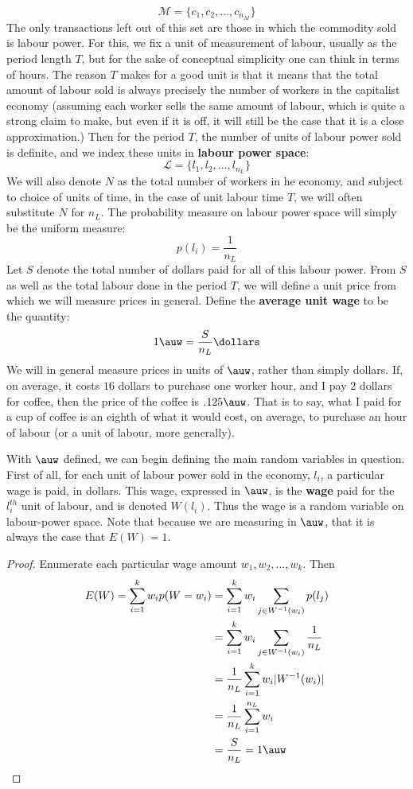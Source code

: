 \[ \mathcal{M} = \{c_1,c_2,...,c_{n_M}\} \]
The only transactions left out of this set are those in which the commodity sold is labour power. For this, we fix a unit of measurement of labour, usually as the period length $T$, but for the sake of conceptual simplicity one can think in terms of hours. The reason $T$ makes for a good unit is that it means that the total amount of labour sold is always precisely the number of workers in the capitalist economy (assuming each worker sells the same amount of labour, which is quite a strong claim to make, but even if it is off, it will still be the case that it is a close approximation.) Then for the period $T$, the number of units of labour power sold is definite, and we index these units in \textbf{labour power space}:
\[ \mathcal{L} = \{l_1,l_2,...,l_{n_L}\} \]
We will also denote $N$ as the total number of workers in he economy, and subject to choice of units of time, in the case of unit labour time $T$, we will often substitute $N$ for $n_L$. The probability measure on labour power space will simply be the uniform measure:
\[ p(l_i) = \frac{1}{n_L} \]
Let $S$ denote the total number of dollars paid for all of this labour power. From $S$ as well as the total labour done in the period $T$, we will define a unit price from which we will measure prices in general. Define the \textbf{average unit wage} to be the quantity:
\[ 1 \auw = \frac{S}{n_L} \dollars \]
We will in general measure prices in units of $\auw$, rather than simply dollars. If, on average, it costs $16$ dollars to purchase one worker hour, and I pay $2$ dollars for coffee, then the price of the coffee is $.125\auw$. That is to say, what I paid for a cup of coffee is an eighth of what it would cost, on average, to purchase an hour of labour (or a unit of labour, more generally). \par 
With $\auw$ defined, we can begin defining the main random variables in question. First of all, for each unit of labour power sold in the economy, $l_i$, a particular wage is paid, in dollars. This wage, expressed in $\auw$, is the \textbf{wage} paid for the $l_i^{th}$ unit of labour, and is denoted $W(l_i)$. Thus the wage is a random variable on labour-power space. Note that because we are measuring in $\auw$, that it is always the case that $E(W) = 1$.
\begin{proof}
	Enumerate each particular wage amount $w_1,w_2,...,w_k$. Then
	\begin{align}
		E(W) = \sum_{i=1}^k w_i p(W = w_i) &= \sum_{i=1}^k w_i \sum_{j \in W^{-1}(w_i)}p(l_j) \\
			&= \sum_{i=1}^k w_i \sum_{j \in W^{-1}(w_i)}\frac{1}{n_L} \\
			&= \frac{1}{n_L}\sum_{i=1}^k w_i |W^{-1}(w_i)| \\
			&= \frac{1}{n_L}\sum_{i=1}^{n_L}w_i \\
			&= \frac{S}{n_L} = 1 \auw
	\end{align}  
\end{proof}
